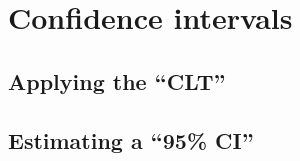 %
%
%
\section{Confidence intervals}

	\subsection{Applying the ``CLT''}

	\subsection{Estimating a ``95\% CI''}
